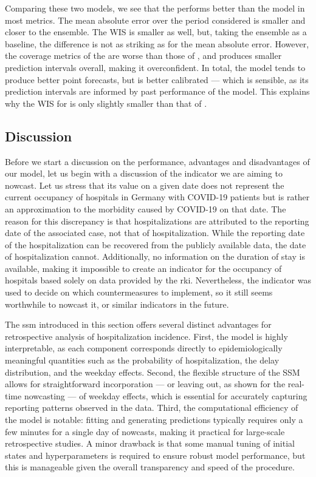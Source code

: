 Comparing these two models, we see that the \ssm performs better than the \ilmpropsmall model in most metrics. The mean absolute error over the period considered is smaller and closer to the ensemble. The WIS is smaller as well, but, taking the ensemble as a baseline, the difference is not as striking as for the mean absolute error. However, the coverage metrics of the \ssm are worse than those of \ilmpropsmall, and \ssm produces smaller prediction intervals overall, making it overconfident. In total, the \ssm model tends to produce better point forecasts, but \ilmpropsmall is better calibrated --- which is sensible, as its prediction intervals are informed by past performance of the model. This explains why the WIS for \ssm is only slightly smaller than that of \ilmpropsmall. 

\subsection{Discussion}

Before we start a discussion on the performance, advantages and disadvantages of our model, let us begin with a discussion of the indicator we are aiming to nowcast. Let us stress that its value on a given date does not represent the current occupancy of hospitals in Germany with COVID-19 patients but is rather an approximation to the morbidity caused by COVID-19 on that date. The reason for this discrepancy is that hospitalizations are attributed to the reporting date of the associated case, not that of hospitalization. While the reporting date of the hospitalization can be recovered from the publicly available data, the date of hospitalization cannot. Additionally, no information on the duration of stay is available, making it impossible to create an indicator for the occupancy of hospitals based solely on data provided by the \gls{rki}.  Nevertheless, the indicator was used to decide on which countermeasures to implement, so it still seems worthwhile to nowcast it, or similar indicators in the future. 

The \gls{ssm} introduced in this section offers several distinct advantages for retrospective analysis of hospitalization incidence.  First, the model is highly interpretable, as each component corresponds directly to epidemiologically meaningful quantities such as the probability of hospitalization, the delay distribution, and the weekday effects. 
Second, the flexible structure of the SSM allows for straightforward incorporation --- or leaving out, as shown for the real-time nowcasting --- of weekday effects, which is essential for accurately capturing reporting patterns observed in the data.  Third, the computational efficiency of the model is notable: fitting and generating predictions typically requires only a few minutes for a single day of nowcasts, making it practical for large-scale retrospective studies. 
A minor drawback is that some manual tuning of initial states and hyperparameters is required to ensure robust model performance, but this is manageable given the overall transparency and speed of the procedure.

